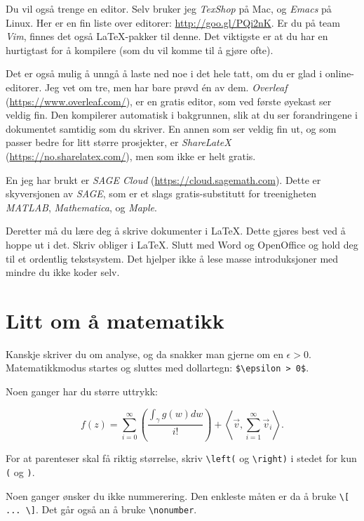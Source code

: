 \documentclass[a4paper, norsk]{article}  %
\begin{document}
Du vil også trenge en editor. Selv bruker jeg \emph{TexShop} på Mac, og \emph{Emacs} på Linux. Her er en fin liste over editorer: \url{http://goo.gl/PQi2nK}. Er du på team \emph{Vim}, finnes det også \LaTeX-pakker til denne. Det viktigste er at du har en hurtigtast for å kompilere (som du vil komme til å gjøre ofte).

Det er også mulig å unngå å laste ned noe i det hele tatt, om du er glad i online-editorer. Jeg vet om tre, men har bare prøvd én av dem. \emph{Overleaf} (\url{https://www.overleaf.com/}), er en gratis editor, som ved første øyekast ser veldig fin. Den kompilerer automatisk i bakgrunnen, slik at du ser forandringene i dokumentet samtidig som du skriver. En annen som ser veldig fin ut, og som passer bedre for litt større prosjekter, er \emph{ShareLateX} (\url{https://no.sharelatex.com/}), men som ikke er helt gratis. 

En jeg har brukt er \emph{SAGE Cloud} (\url{https://cloud.sagemath.com}). Dette er skyversjonen av \emph{SAGE}, som er et slags gratis-substitutt for treenigheten \emph{MATLAB}, \emph{Mathematica}, og \emph{Maple}.

Deretter må du lære deg å skrive dokumenter i \LaTeX. Dette gjøres best ved å hoppe ut i det. Skriv obliger i \LaTeX. Slutt med Word og OpenOffice og hold deg til et ordentlig tekstsystem. Det hjelper ikke å lese masse introduksjoner med mindre du ikke koder selv.

\section{Litt om å matematikk}
\label{seksjonmatte}

Kanskje skriver du om analyse, og da snakker man gjerne om en $\epsilon > 0 $. Matematikkmodus startes og sluttes med dollartegn: \verb|$\epsilon > 0$|. 

Noen ganger har du større uttrykk:

\begin{equation}
f(z) = \sum_{i=0}^\infty \left( 
\frac{\int_\gamma g(w) dw}{i!}
\right) + \left\langle \vec v, \sum_{i=1}^\infty \vec v_i \right\rangle.
\end{equation}

For at parenteser skal få riktig størrelse, skriv \verb|\left(| og \verb|\right)| i stedet for kun \texttt{(} og \texttt{)}.

Noen ganger ønsker du ikke nummerering. Den enkleste måten er da å bruke \verb|\[ ... \]|. Det går også an å bruke \verb|\nonumber|. 
\end{document}
